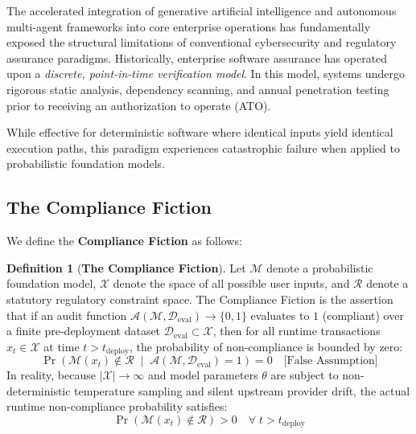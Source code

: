 \documentclass[11pt,a4paper]{article}
\theoremstyle{definition}
\newtheorem{definition}{Definition}
\begin{document}
The accelerated integration of generative artificial intelligence and autonomous multi-agent frameworks into core enterprise operations has fundamentally exposed the structural limitations of conventional cybersecurity and regulatory assurance paradigms. Historically, enterprise software assurance has operated upon a \textit{discrete, point-in-time verification model}. In this model, systems undergo rigorous static analysis, dependency scanning, and annual penetration testing prior to receiving an authorization to operate (ATO).

While effective for deterministic software where identical inputs yield identical execution paths, this paradigm experiences catastrophic failure when applied to probabilistic foundation models.

\subsection{The Compliance Fiction}
\label{subsec:compliance_fiction}

We define the \textbf{Compliance Fiction} as follows:

\begin{definition}[\textbf{The Compliance Fiction}]
Let $\mathcal{M}$ denote a probabilistic foundation model, $\mathcal{X}$ denote the space of all possible user inputs, and $\mathcal{R}$ denote a statutory regulatory constraint space. The Compliance Fiction is the assertion that if an audit function $\mathcal{A}(\mathcal{M}, \mathcal{D}_{\text{eval}}) \to \{0, 1\}$ evaluates to $1$ (compliant) over a finite pre-deployment dataset $\mathcal{D}_{\text{eval}} \subset \mathcal{X}$, then for all runtime transactions $x_t \in \mathcal{X}$ at time $t > t_{\text{deploy}}$, the probability of non-compliance is bounded by zero:
\begin{equation}
    \Pr\left( \mathcal{M}(x_t) \notin \mathcal{R} \;\middle|\; \mathcal{A}(\mathcal{M}, \mathcal{D}_{\text{eval}}) = 1 \right) = 0 \quad \text{[False Assumption]}
\end{equation}
In reality, because $|\mathcal{X}| \to \infty$ and model parameters $\theta$ are subject to non-deterministic temperature sampling and silent upstream provider drift, the actual runtime non-compliance probability satisfies:
\begin{equation}
    \Pr\left( \mathcal{M}(x_t) \notin \mathcal{R} \right) > 0 \quad \forall \; t > t_{\text{deploy}}
\end{equation}
\end{definition}
\end{document}
